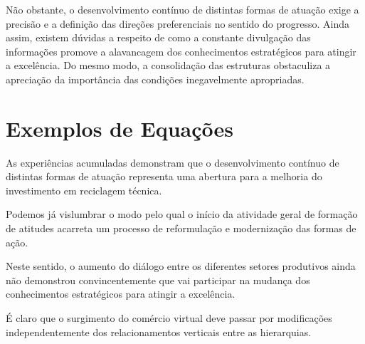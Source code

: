 \documentclass[fleqn]{profmat-cefet}
\begin{document}
Não obstante, o desenvolvimento contínuo de distintas formas de atuação exige a
precisão e a definição das direções preferenciais no sentido do progresso. Ainda
assim, existem dúvidas a respeito de como a constante divulgação das informações
promove a alavancagem dos conhecimentos estratégicos para atingir a excelência.
Do mesmo modo, a consolidação das estruturas obstaculiza a apreciação da
importância das condições inegavelmente apropriadas. 

\section{Exemplos de Equações}
\label{sec:exemplos_equacoes}

As experiências acumuladas demonstram que o desenvolvimento contínuo de
distintas formas de atuação representa uma abertura para a melhoria do
investimento em reciclagem técnica.

Podemos já vislumbrar o modo pelo qual o
início da atividade geral de formação de atitudes acarreta um processo de
reformulação e modernização das formas de ação. 

Neste sentido, o aumento do
diálogo entre os diferentes setores produtivos ainda não demonstrou
convincentemente que vai participar na mudança dos conhecimentos estratégicos
para atingir a excelência. 

É claro que o surgimento do comércio virtual deve
passar por modificações independentemente dos relacionamentos verticais entre as
hierarquias. 
\end{document}
